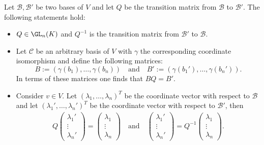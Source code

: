    \begin{property}\label{linalgebra:transition_matrix_properties}
        Let $\mathcal{B},\mathcal{B}'$ be two bases of $V$ and let $Q$ be the transition matrix from $\mathcal{B}$ to $\mathcal{B}'$. The following statements hold:
        \begin{itemize}
            \item $Q\in\GL_n(K)$ and $Q^{-1}$ is the transition matrix from $\mathcal{B}'$ to $\mathcal{B}$.
            \item Let $\mathcal{C}$ be an arbitrary basis of $V$ with $\gamma$ the corresponding coordinate isomorphism and define the following matrices: \[B:=(\gamma(b_1),\ldots,\gamma(b_n))\quad\text{and}\quad B':=(\gamma(b_1'),\ldots,\gamma(b_n')).\] In terms of these matrices one finds that $BQ = B'$.
            \item Consider $v\in V$. Let $(\lambda_1,\ldots,\lambda_n)^T$ be the coordinate vector with respect to $\mathcal{B}$ and let $(\lambda_1',\ldots,\lambda_n')^T$ be the coordinate vector with respect to $\mathcal{B}'$, then
                \begin{gather}
                    Q
                    \begin{pmatrix}
                        \lambda_1'\\\vdots\\\lambda_n'
                    \end{pmatrix}
                    =
                    \begin{pmatrix}
                        \lambda_1\\\vdots\\\lambda_n
                    \end{pmatrix}
                    \quad\text{and}\quad
                    \begin{pmatrix}
                        \lambda_1'\\\vdots\\\lambda_n'
                    \end{pmatrix}
                    = Q^{-1}
                    \begin{pmatrix}
                        \lambda_1\\\vdots\\\lambda_n
                    \end{pmatrix}.
                \end{gather}
        \end{itemize}
    \end{property}
